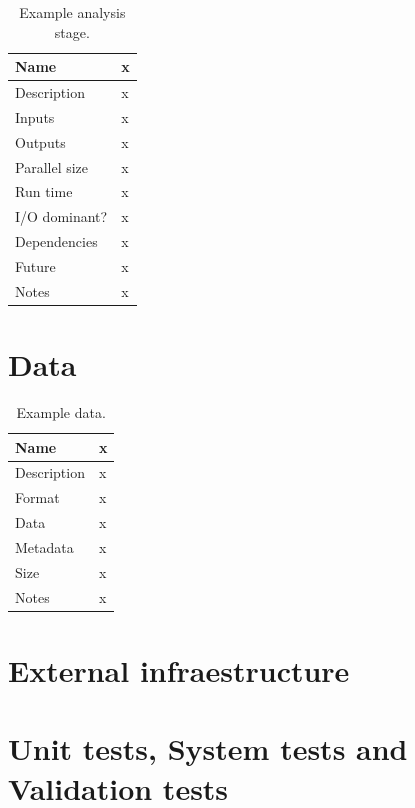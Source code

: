 \documentclass[\docopts]{\docclass}
\begin{document}
\begin{table}[h!]
    \caption{Example analysis stage.}
    \label{tab:stage1}
    \begin{tabular}{| l| l |}
      \hline
      Name & x\\\hline
      Description & x\\\hline
      Inputs & x\\\hline
      Outputs & x\\\hline
      Parallel size & x\\\hline
      Run time & x\\\hline
      I/O dominant? & x\\\hline
      Dependencies & x\\\hline
      Future & x\\\hline
      Notes & x\\\hline
    \end{tabular}
\end{table}

\section{Data}
\label{sec:data}

\begin{table}[h!]
    \caption{Example data.}
    \label{tab:stage1}
    \begin{tabular}{| l| l |}
      \hline
      Name & x\\\hline
      Description & x\\\hline
      Format & x\\\hline
      Data & x\\\hline
      Metadata & x\\\hline
      Size & x\\\hline
      Notes & x\\\hline
    \end{tabular}
\end{table}


\section{External infraestructure}
\label{sec:ext}

\section{Unit tests, System tests and Validation tests}
\label{sec:tests}
\end{document}
